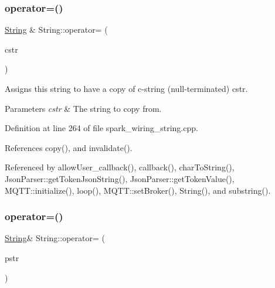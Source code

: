 \subsubsection{\texorpdfstring{operator=()}{operator=()}\hspace{0.1cm}{\footnotesize\ttfamily [2/3]}}
{\footnotesize\ttfamily \hyperlink{class_string}{String} \& String\+::operator= (\begin{DoxyParamCaption}\item[{const char $\ast$}]{cstr }\end{DoxyParamCaption})}



Assigns this string to have a copy of c-\/string (null-\/terminated) cstr. 


\begin{DoxyParams}{Parameters}
{\em cstr} & The string to copy from. \\
\hline
\end{DoxyParams}


Definition at line 264 of file spark\+\_\+wiring\+\_\+string.\+cpp.



References copy(), and invalidate().



Referenced by allow\+User\+\_\+callback(), callback(), char\+To\+String(), Json\+Parser\+::get\+Token\+Json\+String(), Json\+Parser\+::get\+Token\+Value(), M\+Q\+T\+T\+::initialize(), loop(), M\+Q\+T\+T\+::set\+Broker(), String(), and substring().

\mbox{\label{class_string_a965951ee729f850adb40d3c0997922bb}} 
\subsubsection{\texorpdfstring{operator=()}{operator=()}\hspace{0.1cm}{\footnotesize\ttfamily [3/3]}}
{\footnotesize\ttfamily \hyperlink{class_string}{String}\& String\+::operator= (\begin{DoxyParamCaption}\item[{const \+\_\+\+\_\+\+Flash\+String\+Helper $\ast$}]{pstr }\end{DoxyParamCaption})}

\mbox{\label{class_string_a21388f8d52ccecd225db7d6724d3e38f}} 
